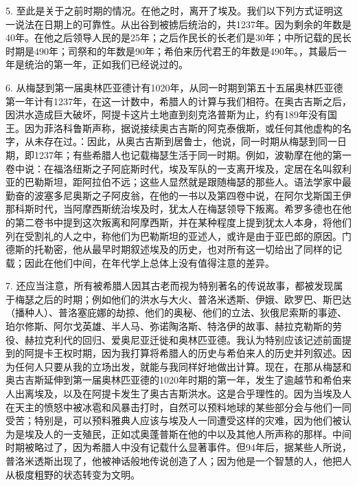 5. 至此是关于之前时期的情况。在他之时，离开了埃及。我们以下列方式证明这一说法在日期上的可靠性。从出谷到被掳后统治的，共1237年。因为剩余的年数是40年。在他之后领导人民的是25年；之后作民长的长老们是30年；中所记载的民长时期是490年；司祭和的年数是90年；希伯来历代君王的年数是490年。，其最后一年是统治的第一年，正如我们已经说过的。\par

6. 从梅瑟到第一届奥林匹亚德计有1020年，从同一时期到第五十五届奥林匹亚德第一年计有1237年，在这一计数中，希腊人的计算与我们相符。在奥古吉斯之后，因洪水造成巨大破坏，阿提卡这片土地直到刻克洛普斯为止，约有189年没有国王。因为菲洛科鲁斯声称，据说接续奥古吉斯的阿克泰俄斯，或任何其他虚构的名字，从未存在过。\newline{}：因此，从奥古吉斯到居鲁士，他说，同一时期从梅瑟到同一日期，即1237年；有些希腊人也记载梅瑟生活于同一时期。例如，波勒摩在他的第一卷中说：在福洛纽斯之子阿庇斯时代，埃及军队的一支离开埃及，定居在名叫叙利亚的巴勒斯坦，距阿拉伯不远；这些人显然就是跟随梅瑟的那些人。语法学家中最勤奋的波塞多尼奥斯之子阿皮翁，在他的一书以及第四卷中说，在阿尔戈斯国王伊那科斯时代，当阿摩西斯统治埃及时，犹太人在梅瑟领导下叛离。希罗多德也在他的第二卷书中提到这次叛离和阿摩西斯，并在某种程度上提到犹太人本身，将他们列在受割礼的人之中，称他们为巴勒斯坦的亚述人，或许是由于亚巴郎的原因。门德斯的托勒密，他从最早时期叙述埃及的历史，也对所有这一切给出了同样的记载；因此在他们中间，在年代学上总体上没有值得注意的差异。\par

7. 还应当注意，所有被希腊人因其古老而视为特别著名的传说故事，都被发现属于梅瑟之后的时期；例如他们的洪水与大火、普洛米透斯、伊娥、欧罗巴、斯巴达（播种人）、普洛塞庇娜的劫掠、他们的奥秘、他们的立法、狄俄尼索斯的事迹、珀尔修斯、阿尔戈英雄、半人马、弥诺陶洛斯、特洛伊的故事、赫拉克勒斯的劳役、赫拉克利代的回归、爱奥尼亚迁徙和奥林匹亚德。我认为特别应该记述前面提到的阿提卡王权时期，因为我打算将希腊人的历史与希伯来人的历史并列叙述。因为任何人只要从我的立场出发，就能与我同样好地做出计算。现在，在那从梅瑟和奥古吉斯延伸到第一届奥林匹亚德的1020年时期的第一年，发生了逾越节和希伯来人出离埃及，以及在阿提卡发生了奥古吉斯洪水。这是合乎理性的。因为当埃及人在天主的愤怒中被冰雹和风暴击打时，自然可以预料地球的某些部分会与他们一同受苦；特别是，可以预料雅典人应该与埃及人一同遭受这样的灾难，因为他们被认为是埃及人的一支殖民，正如忒奥蓬普斯在他的中以及其他人所声称的那样。中间时期被略过了，因为希腊人中没有记载什么显著事件。但94年后，据某些人所说，普洛米透斯出现了，他被神话般地传说创造了人；因为他是一个智慧的人，他把人从极度粗野的状态转变为文明。\par


